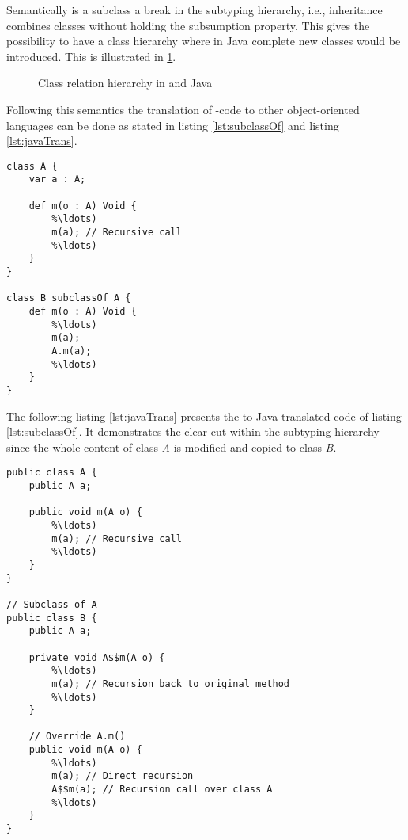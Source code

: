 Semantically is a subclass a break in the subtyping hierarchy, i.e., inheritance
combines classes without holding the subsumption property. This gives \ooplss
the possibility to have a class hierarchy where in Java complete new classes
would be introduced. This is illustrated in \cref{fig:inheritHierarchy}.

\begin{figure}[h]
	\centering
	\caption{Class relation hierarchy in \ooplss and Java}
	\label{fig:inheritHierarchy}
\end{figure}

Following this semantics the translation of \ooplss-code to
other object-oriented languages can be done as stated in listing
\ref{lst:subclassOf} and listing \ref{lst:javaTrans}.

\begin{lstlisting}[language=ooplss,caption=Subtyping in \ooplss,label=lst:subclassOf]
class A {
	var a : A;

	def m(o : A) Void {
		%\ldots)
		m(a); // Recursive call
		%\ldots)
	}
}

class B subclassOf A {
	def m(o : A) Void {
		%\ldots)
		m(a);
		A.m(a);
		%\ldots)
	}
}
\end{lstlisting}

The following listing \ref{lst:javaTrans} presents the to Java translated
code of listing \ref{lst:subclassOf}. It demonstrates the clear cut within 
the subtyping hierarchy since the whole content of class \emph{A} is modified
and copied to class \emph{B}.

\begin{lstlisting}[caption=Subtyping in \ooplss,label=lst:javaTrans]
public class A {
	public A a;

	public void m(A o) {
		%\ldots)
		m(a); // Recursive call
		%\ldots)
	}
}

// Subclass of A
public class B {
	public A a;

	private void A$$m(A o) {
		%\ldots)
		m(a); // Recursion back to original method
		%\ldots)
	}

	// Override A.m()
	public void m(A o) {
		%\ldots)
		m(a); // Direct recursion
		A$$m(a); // Recursion call over class A
		%\ldots)
	}
}
\end{lstlisting}

